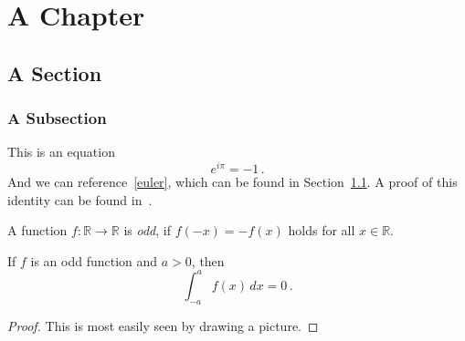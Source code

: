 \chapter{A Chapter}

\section{A Section}
\label{house}

\subsection{A Subsection}

This is an equation
\begin{equation}
\label{euler}
e^{i\pi} = -1\,.
\end{equation}
And we can reference~\eqref{euler}, which can be found in Section~\ref{house}. A proof of this identity can be found in~\cite{LA1979}.

\begin{definition}
A function $f : \mathbb{R} \to \mathbb{R}$ is \emph{odd}, if $f(-x)= -f(x)$ holds for all $x \in \mathbb{R}$.
\end{definition}

\begin{theorem}
If $f$ is an odd function and $a > 0$, then
\[
\int_{-a}^a f(x) \,dx = 0\,.
\]
\end{theorem}

\begin{proof}
This is most easily seen by drawing a picture.
\end{proof}